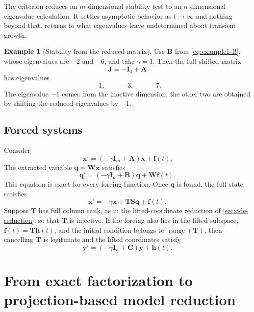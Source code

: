 \documentclass[11pt]{article}
\newcommand{\I}{\mathbf{I}}
\newcommand{\mat}[1]{\mathbf{#1}}
\newcommand{\vect}[1]{\mathbf{#1}}
\newcommand{\range}{\operatorname{range}}
\theoremstyle{definition}
\newtheorem{example}[example]{Example}
\theoremstyle{remark}
\begin{document}
The criterion reduces an \(m\)-dimensional stability test to an \(n\)-dimensional eigenvalue calculation. It settles asymptotic behavior as \(t\to\infty\) and nothing beyond that.  returns to what eigenvalues leave undetermined about transient growth.

\begin{example}[Stability from the reduced matrix]
Use \(\mat{B}\) from \cref{eq:example1-B}, whose eigenvalues are \(-2\) and \(-6\), and take \(\gamma=1\). Then the full shifted matrix
\[
  \mat{J}=-\I_3+\mat{A}
\]
has eigenvalues
\[
  -1,\qquad -3,\qquad -7.
\]
The eigenvalue \(-1\) comes from the inactive dimension; the other two are obtained by shifting the reduced eigenvalues by \(-1\).
\end{example}

\subsection{Forced systems}

Consider
\begin{equation}
  \vect{x}'
  =(-\gamma\I_m+\mat{A})\vect{x}+\vect{f}(t).
  \label{eq:forced-full-ode}
\end{equation}
The extracted variable \(\vect{q}=\mat{W}\vect{x}\) satisfies
\begin{equation}
  \vect{q}'
  =(-\gamma\I_n+\mat{B})\vect{q}
   +\mat{W}\vect{f}(t).
  \label{eq:forced-reduced-q}
\end{equation}
This equation is exact for every forcing function. Once \(\vect{q}\) is found, the full state satisfies
\begin{equation}
  \vect{x}'
  =-\gamma\vect{x}
   +\mat{T}\mat{S}\vect{q}
   +\vect{f}(t).
  \label{eq:forced-reconstruct}
\end{equation}
Suppose \(\mat{T}\) has full column rank, as in the lifted-coordinate reduction of \cref{sec:ode-reduction}, so that \(\mat{T}\) is injective. If the forcing also lies in the lifted subspace, \(\vect{f}(t)=\mat{T}\vect{h}(t)\), and the initial condition belongs to \(\range(\mat{T})\), then cancelling \(\mat{T}\) is legitimate and the lifted coordinates satisfy
\begin{equation}
  \vect{y}'
  =(-\gamma\I_n+\mat{C})\vect{y}+\vect{h}(t).
  \label{eq:forced-reduced-y}
\end{equation}

\section{From exact factorization to projection-based model reduction}
\label{sec:projection}
\end{document}
